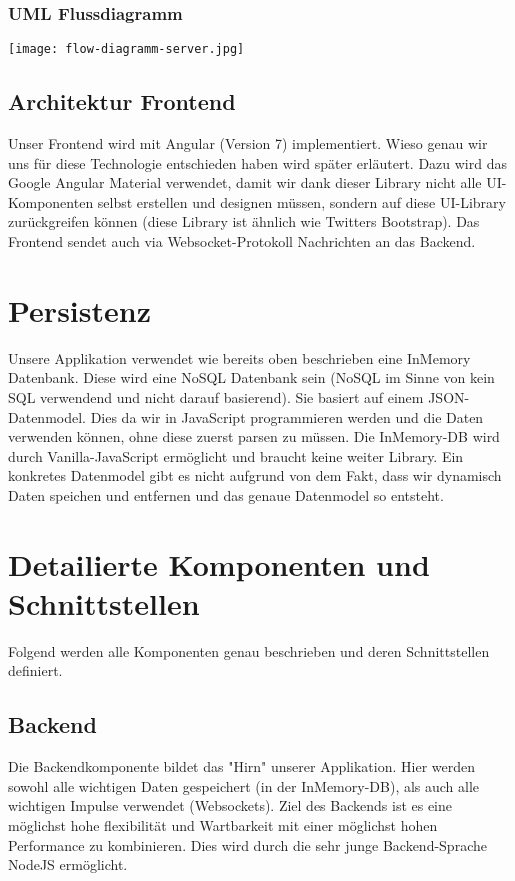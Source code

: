 	\subsubsection{UML Flussdiagramm}
	\texttt{[image: flow-diagramm-server.jpg]}

	\subsection{Architektur Frontend}
	Unser Frontend wird mit Angular (Version 7) implementiert. Wieso genau wir uns für diese Technologie entschieden haben wird später erläutert. Dazu wird das Google Angular Material verwendet, damit wir dank dieser Library nicht alle UI-Komponenten selbst erstellen und designen müssen, sondern auf diese UI-Library zurückgreifen können (diese Library ist ähnlich wie Twitters Bootstrap). Das Frontend sendet auch via Websocket-Protokoll Nachrichten an das Backend.

	\section{Persistenz}
	Unsere Applikation verwendet wie bereits oben beschrieben eine InMemory Datenbank. Diese wird eine NoSQL Datenbank sein (NoSQL im Sinne von kein SQL verwendend und nicht darauf basierend). Sie basiert auf einem JSON-Datenmodel. Dies da wir in JavaScript programmieren werden und die Daten verwenden können, ohne diese zuerst parsen zu müssen. Die InMemory-DB wird durch Vanilla-JavaScript ermöglicht und braucht keine weiter Library. Ein konkretes Datenmodel gibt es nicht aufgrund von dem Fakt, dass wir dynamisch Daten speichen und entfernen und das genaue Datenmodel so entsteht.

	\section{Detailierte Komponenten und Schnittstellen}
	Folgend werden alle Komponenten genau beschrieben und deren Schnittstellen definiert.

	\subsection{Backend}
	Die Backendkomponente bildet das "Hirn" unserer Applikation. Hier werden sowohl alle wichtigen Daten gespeichert (in der InMemory-DB), als auch alle wichtigen Impulse verwendet (Websockets). Ziel des Backends ist es eine möglichst hohe flexibilität und Wartbarkeit mit einer möglichst hohen Performance zu kombinieren. Dies wird durch die sehr junge Backend-Sprache NodeJS ermöglicht.


